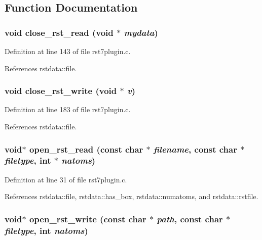 \subsection{Function Documentation}
\subsubsection{\setlength{\rightskip}{0pt plus 5cm}void close\_\-rst\_\-read (void $\ast$ {\em mydata})\hspace{0.3cm}{\tt  [static]}}\label{rst7plugin_8c_a3}




Definition at line 143 of file rst7plugin.c.

References rstdata::file.
\subsubsection{\setlength{\rightskip}{0pt plus 5cm}void close\_\-rst\_\-write (void $\ast$ {\em v})\hspace{0.3cm}{\tt  [static]}}\label{rst7plugin_8c_a6}




Definition at line 183 of file rst7plugin.c.

References rstdata::file.
\subsubsection{\setlength{\rightskip}{0pt plus 5cm}void$\ast$ open\_\-rst\_\-read (const char $\ast$ {\em filename}, const char $\ast$ {\em filetype}, int $\ast$ {\em natoms})\hspace{0.3cm}{\tt  [static]}}\label{rst7plugin_8c_a1}




Definition at line 31 of file rst7plugin.c.

References rstdata::file, rstdata::has\_\-box, rstdata::numatoms, and rstdata::rstfile.
\subsubsection{\setlength{\rightskip}{0pt plus 5cm}void$\ast$ open\_\-rst\_\-write (const char $\ast$ {\em path}, const char $\ast$ {\em filetype}, int {\em natoms})\hspace{0.3cm}{\tt  [static]}}\label{rst7plugin_8c_a4}




